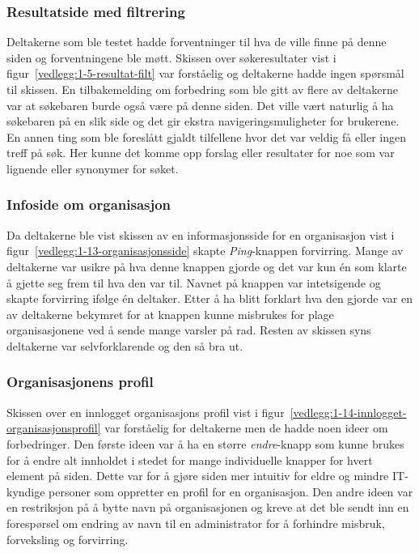 \subsubsection{Resultatside med filtrering}

Deltakerne som ble testet hadde forventninger til hva de ville finne på denne siden og forventningene ble møtt. 
Skissen over søkeresultater vist i figur~\ref{vedlegg:1-5-resultat-filt} var forståelig og deltakerne hadde ingen spørsmål til skissen.
En tilbakemelding om forbedring som ble gitt av flere av deltakerne var at søkebaren burde også være på denne siden. Det ville vært naturlig å ha søkebaren på en slik side og det gir ekstra navigeringsmuligheter for brukerene. En annen ting som ble foreslått gjaldt tilfellene hvor det var veldig få eller ingen treff på søk. Her kunne det komme opp forslag eller resultater for noe som var lignende eller synonymer for søket.


\subsubsection{Infoside om organisasjon}

Da deltakerne ble vist skissen av en informasjonsside for en organisasjon vist i figur~\ref{vedlegg:1-13-organisasjonsside} skapte {\em  Ping}-knappen forvirring. Mange av deltakerne var usikre på hva denne knappen gjorde og det var kun én som klarte å gjette seg frem til hva den var til. Navnet på knappen var intetsigende og skapte forvirring ifølge én deltaker. Etter å ha blitt forklart hva den gjorde var en av deltakerne bekymret for at knappen kunne misbrukes for plage organisasjonene ved å sende mange varsler på rad. Resten av skissen syns deltakerne var selvforklarende og den så bra ut. 


\subsubsection{Organisasjonens profil}

Skissen over en innlogget organisasjons profil vist i figur~\ref{vedlegg:1-14-innlogget-organisasjonsprofil} var forståelig for deltakerne men de hadde noen ideer om forbedringer. Den første ideen var å ha en større {\em  endre}-knapp som kunne brukes for å endre alt innholdet i stedet for mange individuelle knapper for hvert element på siden. Dette var for å gjøre siden mer intuitiv for eldre og mindre IT-kyndige personer som oppretter en profil for en  organisasjon. Den andre ideen var en restriksjon på å bytte navn på organisasjonen og kreve at det ble sendt inn en forespørsel om endring av navn til en administrator for å forhindre misbruk, forveksling og forvirring.

